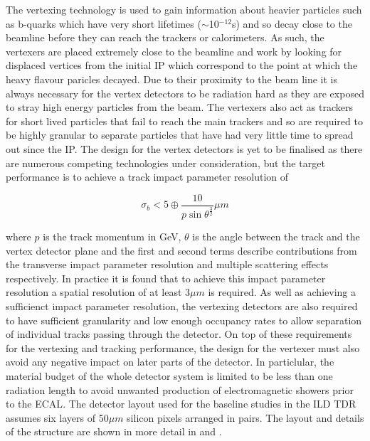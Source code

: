The vertexing technology is used to gain information about heavier particles such as b-quarks which have very short lifetimes ($\sim$10$^{-12}$s) and so decay close to the beamline before they can reach the trackers or calorimeters. As such, the vertexers are placed extremely close to the beamline and work by looking for displaced vertices from the initial \ac{IP} which correspond to the point at which the heavy flavour paricles decayed. Due to their proximity to the beam line it is always necessary for the vertex detectors to be radiation hard as they are exposed to stray high energy particles from the beam. The vertexers also act as trackers for short lived particles that fail to reach the main trackers and so are required to be highly granular to separate particles that have had very little time to spread out since the \ac{IP}. The design for the vertex detectors is yet to be finalised as there are numerous competing technologies under consideration, but the target performance is to achieve a track impact parameter resolution of

\begin{equation}
\sigma_{b} < 5 \oplus \frac{10}{p\sin\theta^{\frac{3}{2}}}\mu m
\end{equation}

where $p$ is the track momentum in GeV, $\theta$ is the angle between the track and the vertex detector plane and the first and second terms describe contributions from the transverse impact parameter resolution and multiple scattering effects respectively.  In practice it is found that to achieve this impact parameter resolution a spatial resolution of at least 3$\mu m$ is required. As well as achieving a sufficienct impact parameter resolution, the vertexing detectors are also required to have sufficient granularity and low enough occupancy rates to allow separation of individual tracks passing through the detector. On top of these requirements for the vertexing and tracking performance, the design for the vertexer must also avoid any negative impact on later parts of the detector. In particlular, the material budget of the whole detector system is limited to be less than one radiation length to avoid unwanted production of electromagnetic showers prior to the \ac{ECAL}. The detector layout used for the baseline studies in the \ac{ILD} \ac{TDR} assumes six layers of 50$\mu m$ silicon  pixels arranged in pairs. The layout and details of the structure are shown in more detail in  and .

